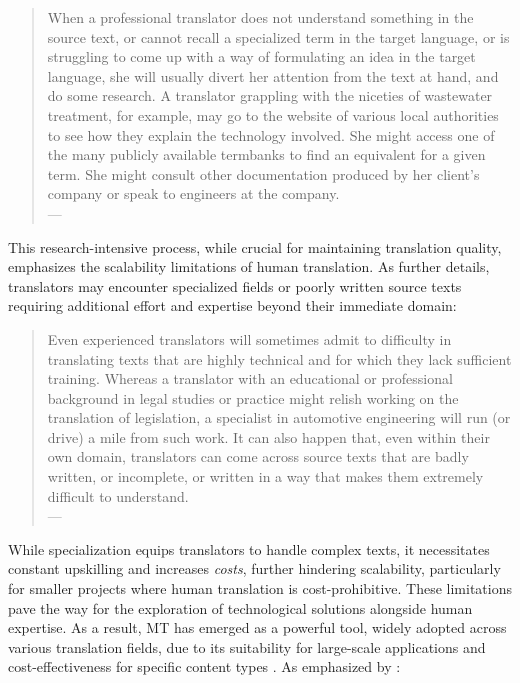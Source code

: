 \begin{quote}
When a professional translator does not understand something in the source text, or cannot recall a specialized term in the target language, or is struggling to come up with a way of formulating an idea in the target language, she will usually divert her attention from the text at hand, and do some research. A translator grappling with the niceties of wastewater treatment, for example, may go to the website of various local authorities to see how they explain the technology involved. She might access one of the many publicly available termbanks to find an equivalent for a given term. She might consult other documentation produced by her client’s company or speak to engineers at the company. \\
\phantom{abc} 
\hfill --- \textcite[29]{kenny2022human}
\end{quote}

This research-intensive process, while crucial for maintaining translation quality, emphasizes the scalability limitations of human translation. As \textcite{kenny2022human} further details, translators may encounter specialized fields or poorly written source texts requiring additional effort and expertise beyond their immediate domain:

\begin{quote}
Even experienced translators will sometimes admit to difficulty in translating texts that are highly technical and for which they lack sufficient training. Whereas a translator with an educational or professional background in legal studies or practice might relish working on the translation of legislation, a specialist in automotive engineering will run (or drive) a mile from such work. It can also happen that, even within their own domain, translators can come across source texts that are badly written, or incomplete, or written in a way that makes them extremely difficult to understand. \\
\phantom{abc}
\hfill --- \textcite[29]{kenny2022human}
\end{quote}

While specialization equips translators to handle complex texts, it necessitates constant upskilling and increases \emph{costs}, further hindering scalability, particularly for smaller projects where human translation is cost-prohibitive. These limitations pave the way for the exploration of technological solutions alongside human expertise. As a result, MT has emerged as a powerful tool, widely adopted across various translation fields, due to its suitability for large-scale applications and cost-effectiveness for specific content types  \parencite{karakanta-etal-2020-42}. As emphasized by \textcite{kenny2022human}:


